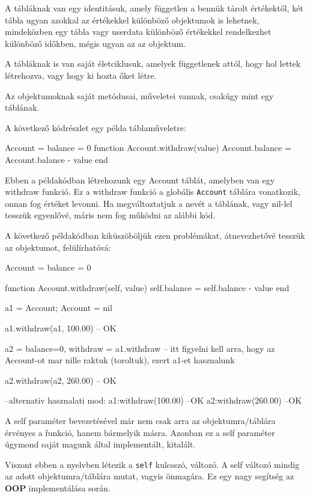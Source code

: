 A tábláknak van egy identitásuk, amely független a bennük tárolt értékektől, két tábla ugyan azokkal az értékekkel különböző objektumok is lehetnek, mindeközben egy tábla vagy userdata különböző értékekkel rendelkezhet különböző időkben, mégis ugyan az az objektum.

A tábláknak is van saját életciklusuk, amelyek függetlenek attól, hogy hol lettek létrehozva, vagy hogy ki hozta őket létre.

Az objektumoknak saját metódusai, műveletei vannak, csakúgy mint egy táblának.

A következő kódrészlet egy példa táblaműveletre:
\begin{lua}
Account = {balance = 0}
function Account.withdraw(value)
  Account.balance = Account.balance - value
end
\end{lua}
Ebben a példakódban létrehozunk egy Account táblát, amelyben van egy withdraw funkció. Ez a withdraw funkció a globális \texttt{Account} táblára vonatkozik, onnan fog értéket levonni. Ha megváltoztatjuk a nevét a táblának, vagy nil-lel tesszük egyenlővé, máris nem fog működni az alábbi kód.

A következő példakódban kiküszöböljük ezen problémákat, átnevezhetővé tesszük az objektumot, felülírhatóvá:

\begin{lua}
Account = {balance = 0}

function Account.withdraw(self, value)
  self.balance = self.balance - value
end 

a1 = Account; Account = nil

a1.withdraw(a1, 100.00)   -- OK

a2 = {balance=0, withdraw = a1.withdraw} -- itt figyelni kell arra, hogy az Account-ot mar nille raktuk (toroltuk), ezert a1-et hasznalunk 

a2.withdraw(a2, 260.00) -- OK

--alternativ hasznalati mod:
a1:withdraw(100.00) --OK
a2:withdraw(260.00) --OK
\end{lua}

A self paraméter bevezetésével már nem csak arra az objektumra/táblára érvényes a funkció, hanem bármelyik másra. Azonban ez a self paraméter úgymond saját magunk által implementált, kitalált.

Viszont ebben a nyelvben létezik a \texttt{self} kulcsszó, változó. A self változó mindig az adott objektumra/táblára mutat, vagyis önmagára. Ez egy nagy segítség az \textbf{OOP} implementálása során.

